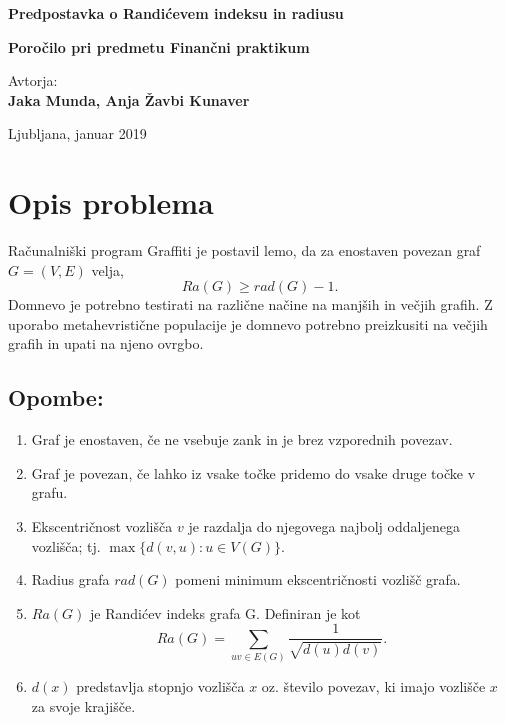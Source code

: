 \documentclass[a4paper, 10pt]{article}
\begin{document}
\begin{titlepage}
\begin{center}

\Huge 
\textbf{Predpostavka o Randićevem indeksu in radiusu}

\vspace{1cm}
\Large
\textbf{Poročilo pri predmetu Finančni praktikum}

\vspace{1cm}

\vspace{2,5cm}
\large
Avtorja:\\
\textbf{Jaka Munda, Anja Žavbi Kunaver}\\

\vfill

\Large Ljubljana, januar 2019

\end{center}
\end{titlepage}

\tableofcontents

\pagebreak

\section{Opis problema}
Računalniški program Graffiti je postavil lemo, da za enostaven povezan graf $G=(V, E)$ velja, $$ Ra(G) \geq rad(G) -1.$$
Domnevo je potrebno testirati na različne načine na manjših in večjih grafih.
Z uporabo metahevristične populacije je domnevo potrebno preizkusiti na večjih grafih in upati na njeno ovrgbo.

\subsection*{Opombe:}
\begin{enumerate}
\item Graf je enostaven, če ne vsebuje zank in je brez vzporednih povezav.
\item Graf je povezan, če lahko iz vsake točke pridemo do vsake druge točke v grafu.
\item Ekscentričnost vozlišča $v$ je razdalja do njegovega najbolj oddaljenega vozlišča; tj. $\max \{d(v,u) : u \in V(G) \}$.
\item Radius grafa $rad(G)$ pomeni minimum ekscentričnosti vozlišč grafa.
\item $Ra(G)$ je Randićev indeks grafa G. Definiran je kot
$$Ra(G) = \sum_{uv \in E(G)} \frac{1}{\sqrt{d(u) d(v)}}.$$
\item $d(x)$ predstavlja stopnjo vozlišča $x$ oz. število povezav, ki imajo vozlišče $x$ za svoje krajišče.
\end{enumerate}
\end{document}
